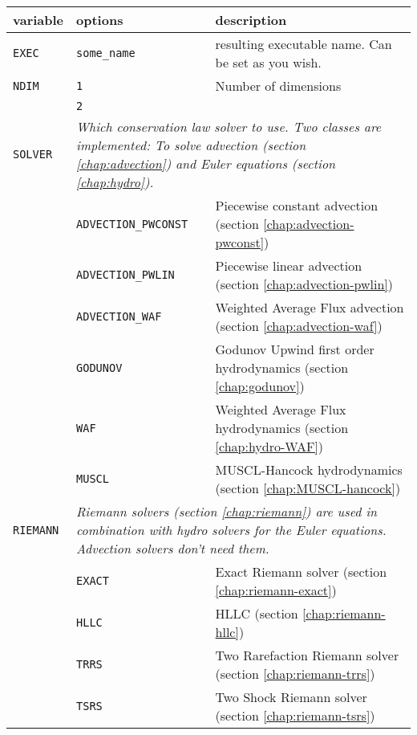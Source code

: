 \begin{center}
\begin{tabular}{l p{4cm} p{8cm}}
\textbf{variable}		&	\textbf{options}			& 	\textbf{description}	\\
\hline

\texttt{EXEC} 			&	\texttt{some_name} 			&	resulting executable name. Can be set as you wish. \\
\hline


\texttt{NDIM}			&	\texttt{1}					& 	Number of dimensions 	\\
						&	\texttt{2}					&	\\
\hline

\texttt{SOLVER}			&	\multicolumn{2}{p{13cm}}{\textit{%
							Which conservation law solver to use. Two classes are implemented: 
							To solve advection (section \ref{chap:advection}) and Euler equations 
							(section \ref{chap:hydro}).}} \\
						&	\texttt{ADVECTION_PWCONST}	&	Piecewise constant advection (section \ref{chap:advection-pwconst}) \\
						&	\texttt{ADVECTION_PWLIN}	&	Piecewise linear advection (section \ref{chap:advection-pwlin}) \\
						&	\texttt{ADVECTION_WAF}		&	Weighted Average Flux advection (section \ref{chap:advection-waf}) \\
						&	\texttt{GODUNOV}			&	Godunov Upwind first order hydrodynamics (section \ref{chap:godunov}) \\
						&	\texttt{WAF}				&	Weighted Average Flux hydrodynamics (section \ref{chap:hydro-WAF}) \\
						&	\texttt{MUSCL}				&	MUSCL-Hancock hydrodynamics (section \ref{chap:MUSCL-hancock}) \\
\hline

\texttt{RIEMANN}		&	\multicolumn{2}{p{13cm}}{\textit{%
							Riemann solvers (section \ref{chap:riemann}) are used in combination with hydro solvers 
							for the Euler equations. Advection solvers don't need them.}}\\
						&	\texttt{EXACT}				&	Exact Riemann solver (section \ref{chap:riemann-exact}) \\
						&	\texttt{HLLC}				&	HLLC (section \ref{chap:riemann-hllc}) \\
						&	\texttt{TRRS}				&	Two Rarefaction Riemann solver (section \ref{chap:riemann-trrs}) \\
						&	\texttt{TSRS}				&	Two Shock Riemann solver (section \ref{chap:riemann-tsrs}) \\
\hline


\end{tabular}
\end{center}
